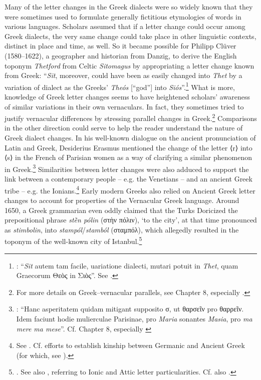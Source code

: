 Many of the letter changes in the Greek dialects were so widely known that they were sometimes used to formulate generally fictitious etymologies of words in various languages. Scholars assumed that if a letter change could occur among Greek dialects, the very same change could take place in other linguistic contexts, distinct in place and time, as well. So it became possible for Philipp Clüver (1580–1622), a geographer and historian from Danzig, to derive the English toponym \textit{Thetford} from Celtic \textit{Sitomagus} by appropriating a letter change known from Greek: “\textit{Sit}, moreover, could have been as easily changed into \textit{Thet} by a variation of dialect as the Greeks’ \textit{Theós} [“god”] into \textit{Siós}”.\footnote{{\citet[64]{Cluver1616}: “}{\textit{Sit}} {autem tam facile, uariatione dialecti, mutari potuit in} {\textit{Thet}}{, quam Graecorum Θεὸς in Σιὸς”. See \citet[114--115]{Metcalf2013}.}} What is more, knowledge of Greek letter changes seems to have heightened scholars’ awareness of similar variations in their own vernaculars. In fact, they sometimes tried to justify vernacular differences by stressing parallel changes in Greek.\footnote{{For more details on Greek–vernacular parallels, see Chapter 8, especially .}} Comparisons in the other direction could serve to help the reader understand the nature of Greek dialect changes. In his well-known dialogue on the ancient pronunciation of Latin and Greek, Desiderius Erasmus mentioned the change of the letter ⟨r⟩ into ⟨s⟩ in the French of Parisian women as a way of clarifying a similar phenomenon in Greek.\footnote{{\citet[52]{Erasmus1528}: “Hanc asperitatem quidam mitigant supposito σ, ut θαρσεῖν pro θαρρεῖν. Idem faciunt hodie mulierculae Parisinae, pro} {\textit{Maria}} {sonantes} {\textit{Masia}}{, pro} {\textit{ma mere ma mese}}{”. Cf. Chapter 8, especially }} Similarities between letter changes were also adduced to support the link between a contemporary people – e.g. the Venetians – and an ancient Greek tribe – e.g. the Ionians.\footnote{{See \citet[97{\textsc{\textsuperscript{r}}}]{Da1509}. Cf. \citet[e.g., 122, 125, 126–127]{Reitz1730} efforts to establish kinship between Germanic and Ancient Greek (for which, see \citealt{VanHal2016}).}} Early modern Greeks also relied on Ancient Greek letter changes to account for properties of the Vernacular Greek language. Around 1650, a Greek grammarian even oddly claimed that the Turks Doricized the prepositional phrase \textit{stḕn pólin} (στὴν πόλιν), ‘to the city’, at that time pronounced as \textit{stimbolin}, into \textit{stampól}/\textit{stamból} (σταμπόλ), which allegedly resulted in the toponym of the well-known city of Istanbul.\footnote{{\citet[14]{Nikiforos1908}. See also \citet[35]{Nikiforos1908}, referring to Ionic and Attic letter particularities. Cf.} also \citet[\textsc{a.4}\textsc{\textsuperscript{r}}]{Rodigast1685}.}

